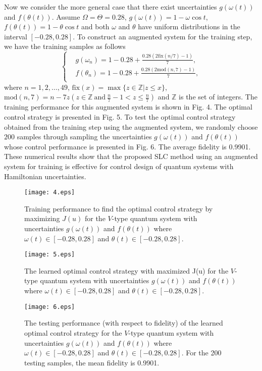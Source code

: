\documentclass[letterpaper, 10 pt, conference]{ieeeconf}
\begin{document}
Now we consider the more general case that there exist uncertainties  $g(\omega(t))$ and $f(\theta(t))$. Assume
$\Omega=\Theta=0.28$, $g(\omega(t))=1-\omega \cos t$, $f(\theta(t))=1-\theta \cos t$ and both $\omega$ and $\theta$ have uniform
distributions in the interval $[-0.28, 0.28]$.
To construct an augmented system for the
training step, we have the training samples as follows
\begin{equation}
\left\{ \begin{split}
& g(\omega_{n})=1-0.28+\frac{0.28(2\text{fix}(n/7)-1)}{7},\\
& f(\theta_{n})=1-0.28+\frac{0.28(2\text{mod}(n,7)-1)}{7}, \\
\end{split}\right.
\end{equation}
where $n=1,2,\ldots,49$, $\text{fix}(x)=\max \{z\in \mathbb{Z}|z\leq x\}$, $\text{mod}(n,7)=n-7z (z\in \mathbb{Z}\ \text{and}\ \frac{n}{7}-1<z\leq \frac{n}{7} )$ and $\mathbb{Z}$ is the set of integers.
The training
performance for this augmented system is shown in Fig. 4. The optimal control strategy is
presented in Fig. 5.
To test the optimal control strategy obtained from the training
step using the augmented system, we randomly choose $200$
samples through sampling the uncertainties $g(\omega(t))$ and $f(\theta(t))$ whose control performance is presented
in Fig. 6. The average fidelity is 0.9901.
These numerical results show that the proposed SLC method
using an augmented system for training is effective for control
design of quantum systems with Hamiltonian uncertainties.


\begin{figure}\label{fig4}
\centering
\texttt{[image: 4.eps]}
\caption{Training performance to find the optimal control
strategy by maximizing $J(u)$ for the $V$-type quantum system with
uncertainties $g(\omega(t))$ and $f(\theta(t))$ where $\omega(t) \in [-0.28, 0.28]$ and $\theta(t) \in [-0.28, 0.28]$.}
\end{figure}

\begin{figure}\label{fig5}
\centering
\texttt{[image: 5.eps]}
\caption{The learned optimal control strategy with maximized J(u)
for the $V$-type  quantum system with
uncertainties $g(\omega(t))$ and $f(\theta(t))$ where $\omega(t) \in [-0.28, 0.28]$ and $\theta(t) \in [-0.28, 0.28]$.}
\end{figure}

\begin{figure*}\label{fig6}
\centering
\texttt{[image: 6.eps]}
\caption{The testing performance (with respect to fidelity) of the
learned optimal control strategy for the $V$-type  quantum system with
uncertainties $g(\omega(t))$ and $f(\theta(t))$ where $\omega(t) \in [-0.28, 0.28]$ and $\theta(t) \in [-0.28, 0.28]$.
For the 200 testing samples, the mean fidelity is 0.9901.}
\end{figure*}
\end{document}
